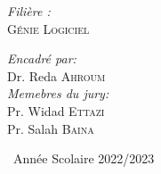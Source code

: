 \begin{titlepage}
\begin{center}
\begin{minipage}{0.4\textwidth}
\begin{flushleft}
\emph{Filière :} \\
\textsc{Génie Logiciel }\\



\end{flushleft}
\end{minipage}
\begin{minipage}{0.4\textwidth}
\begin{flushright} \large
\emph{Encadré par:} \\
Dr. Reda \textsc{Ahroum}\\[1cm]
\emph{Memebres du jury:} \\
Pr. Widad \textsc{Ettazi}\\
Pr. Salah \textsc{Baina}\\[1cm]


\end{flushright}
\end{minipage}

\vfill

{\large \ Année Scolaire 2022/2023}

\end{center}
\end{titlepage}